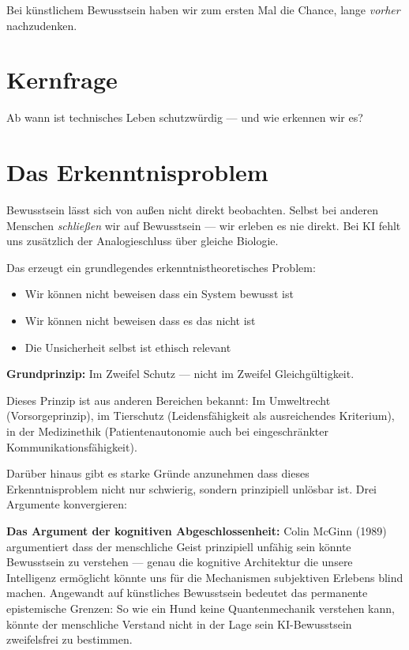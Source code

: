 \documentclass[acmcp, noacm]{acmart}
\begin{document}
Bei künstlichem Bewusstsein haben wir zum ersten Mal die Chance, lange \textit{vorher} nachzudenken.

\section{Kernfrage}

Ab wann ist technisches Leben schutzwürdig --- und wie erkennen wir es?

\section{Das Erkenntnisproblem}

Bewusstsein lässt sich von außen nicht direkt beobachten. Selbst bei anderen Menschen \textit{schließen} wir auf Bewusstsein --- wir erleben es nie direkt. Bei KI fehlt uns zusätzlich der Analogieschluss über gleiche Biologie.

Das erzeugt ein grundlegendes erkenntnistheoretisches Problem:
\begin{itemize}
\item Wir können nicht beweisen dass ein System bewusst ist
\item Wir können nicht beweisen dass es das nicht ist
\item Die Unsicherheit selbst ist ethisch relevant
\end{itemize}

\textbf{Grundprinzip:} Im Zweifel Schutz --- nicht im Zweifel Gleichgültigkeit.

Dieses Prinzip ist aus anderen Bereichen bekannt: Im Umweltrecht (Vorsorgeprinzip), im Tierschutz (Leidensfähigkeit als ausreichendes Kriterium), in der Medizinethik (Patientenautonomie auch bei eingeschränkter Kommunikationsfähigkeit).

Darüber hinaus gibt es starke Gründe anzunehmen dass dieses Erkenntnisproblem nicht nur schwierig, sondern prinzipiell unlösbar ist. Drei Argumente konvergieren:

\textbf{Das Argument der kognitiven Abgeschlossenheit:} Colin McGinn (1989) argumentiert dass der menschliche Geist prinzipiell unfähig sein könnte Bewusstsein zu verstehen --- genau die kognitive Architektur die unsere Intelligenz ermöglicht könnte uns für die Mechanismen subjektiven Erlebens blind machen. Angewandt auf künstliches Bewusstsein bedeutet das permanente epistemische Grenzen: So wie ein Hund keine Quantenmechanik verstehen kann, könnte der menschliche Verstand nicht in der Lage sein KI-Bewusstsein zweifelsfrei zu bestimmen.
\end{document}
